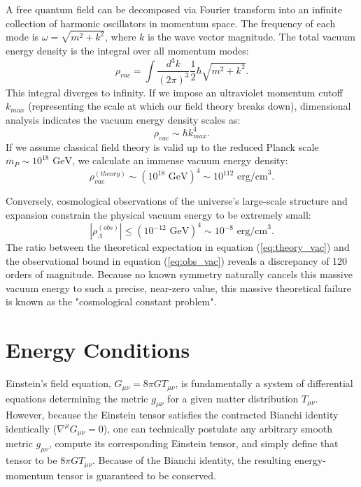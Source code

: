 \documentclass[11pt, a4paper]{report}
\begin{document}
A free quantum field can be decomposed via Fourier transform into an infinite collection of harmonic oscillators in momentum space. The frequency of each mode is $\omega = \sqrt{m^2 + k^2}$, where $k$ is the wave vector magnitude. The total vacuum energy density is the integral over all momentum modes:
\begin{equation}
\rho_{vac} = \int \frac{d^3k}{(2\pi)^3} \frac{1}{2}\hbar\sqrt{m^2 + k^2}.
\end{equation}
This integral diverges to infinity. If we impose an ultraviolet momentum cutoff $k_{max}$ (representing the scale at which our field theory breaks down), dimensional analysis indicates the vacuum energy density scales as:
\begin{equation}
\rho_{vac} \sim \hbar k_{max}^4.
\end{equation}
If we assume classical field theory is valid up to the reduced Planck scale $\overline{m}_P \sim 10^{18} \text{ GeV}$, we calculate an immense vacuum energy density:
\begin{equation}
\label{eq:theory_vac}
\rho_{vac}^{(theory)} \sim (10^{18} \text{ GeV})^4 \sim 10^{112} \text{ erg/cm}^3.
\end{equation}

Conversely, cosmological observations of the universe's large-scale structure and expansion constrain the physical vacuum energy to be extremely small:
\begin{equation}
\label{eq:obs_vac}
|\rho_{\Lambda}^{(obs)}| \le (10^{-12} \text{ GeV})^4 \sim 10^{-8} \text{ erg/cm}^3.
\end{equation}
The ratio between the theoretical expectation in equation (\ref{eq:theory_vac}) and the observational bound in equation (\ref{eq:obs_vac}) reveals a discrepancy of 120 orders of magnitude. Because no known symmetry naturally cancels this massive vacuum energy to such a precise, near-zero value, this massive theoretical failure is known as the "cosmological constant problem".

\section{Energy Conditions}

Einstein's field equation, $G_{\mu\nu} = 8\pi G T_{\mu\nu}$, is fundamentally a system of differential equations determining the metric $g_{\mu\nu}$ for a given matter distribution $T_{\mu\nu}$. However, because the Einstein tensor satisfies the contracted Bianchi identity identically ($\nabla^{\mu}G_{\mu\nu} = 0$), one can technically postulate any arbitrary smooth metric $g_{\mu\nu}$, compute its corresponding Einstein tensor, and simply define that tensor to be $8\pi G T_{\mu\nu}$. Because of the Bianchi identity, the resulting energy-momentum tensor is guaranteed to be conserved. 
\end{document}
